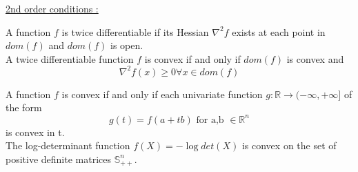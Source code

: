 \documentclass[../main.tex]{subfiles}
\begin{document}
\quad \underline{2nd order conditions :}\\

\begin{theorem}
    A function $f$ is twice differentiable if its Hessian $\nabla^2 f$ exists at each point in $dom(f)$ and $dom(f)$ is open. \\
    A twice differentiable function $f$ is convex if and only if $dom(f)$ is convex and \begin{equation}
        \nabla^2 f(x) \geq 0 \forall x \in dom(f)
    \end{equation}
\end{theorem}

A function $f$ is convex if and only if each univariate function $g : \mathbb{R} \rightarrow (-\infty, +\infty]$ of the form \begin{equation}
    g(t) = f(a + tb) \text{ for a,b } \in \mathbb{R}^n
\end{equation}
is convex in t.\\

The log-determinant function $f(X) = -\log det(X)$ is convex on the set of positive definite matrices $\mathbb{S}^n_{++}$.\\
\end{document}
